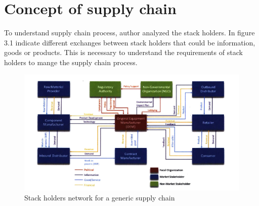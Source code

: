 \section{Concept of supply chain }
To understand supply chain process, author analyzed the stack holders. In figure 3.1 indicate different exchanges between stack holders that could be information, goods or products. This is necessary to understand the requirements of stack holders to mange the supply chain process.
\\
\begin{center}
	
	\begin{figure}[htb!]
		
		\begin{minipage}{0.75\linewidth}
			
			\includegraphics[width=1.45\textwidth]{images/chap03_stackholders.png}
		\end{minipage}
		\caption{Stack holders network for a generic supply chain}
		
	\end{figure}
	
\end{center}

